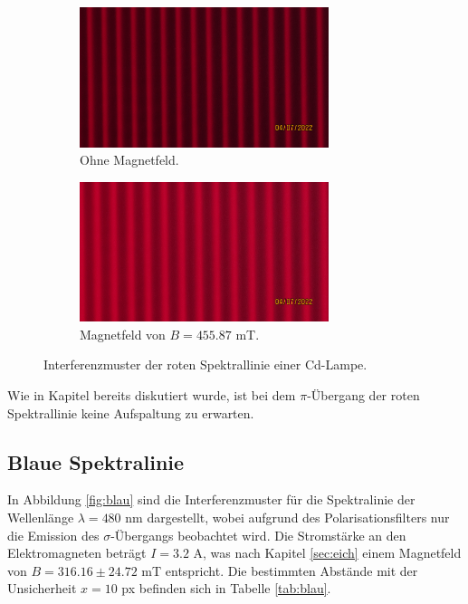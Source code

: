 \begin{figure}[H]
	\centering
	\begin{subfigure}[b]{0.8\textwidth}
		\centering
		\includegraphics[width=0.8\textwidth]{data/rot2.JPG}
		\caption{Ohne Magnetfeld.}
    \label{fig:rot1}
	\end{subfigure}
	
	\begin{subfigure}[b]{0.8\textwidth}
		\centering
		\includegraphics[width=0.8\textwidth]{data/rot2b.JPG}
		\caption{Magnetfeld von $B= 455.87$ mT.}
    \label{fig:rot1b}
	\end{subfigure}
    \caption{Interferenzmuster der roten Spektrallinie einer Cd-Lampe.}
\label{fig:rot22}
\end{figure}

\noindent
Wie in Kapitel %
bereits diskutiert wurde, ist bei dem $\pi$-Übergang der roten Spektrallinie keine Aufspaltung zu erwarten.

\subsection{Blaue Spektralinie}
In Abbildung \ref{fig:blau} sind die Interferenzmuster für die Spektralinie der Wellenlänge $\lambda=480$ nm dargestellt, 
wobei aufgrund des Polarisationsfilters nur die Emission des $\sigma$-Übergangs beobachtet wird.
Die Stromstärke an den Elektromagneten beträgt $I=3.2$ A, was nach Kapitel \ref{sec:eich} einem Magnetfeld von $B = 316.16 \pm 24.72$ mT entspricht.
Die bestimmten Abstände mit der Unsicherheit $x=10$ px befinden sich in Tabelle \ref{tab:blau}.


